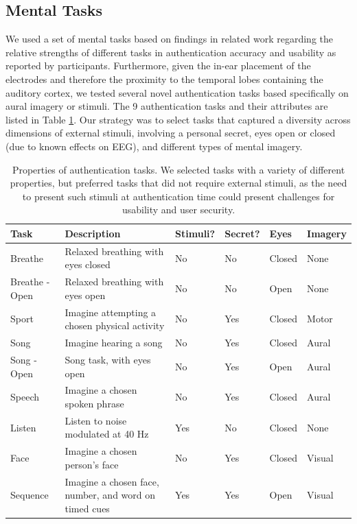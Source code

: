 \documentclass{sigchi}
\begin{document}
\subsection{Mental Tasks}

We used a set of mental tasks based on findings in related work regarding the relative strengths of different tasks in authentication accuracy and usability as reported by participants. Furthermore, given the in-ear placement of the electrodes and therefore the proximity to the temporal lobes containing the auditory cortex, we tested several novel authentication tasks based specifically on aural imagery or stimuli. The 9 authentication tasks and their attributes are listed in Table \ref{tab:tasks}. Our strategy was to select tasks that captured a diversity across dimensions of external stimuli, involving a personal secret, eyes open or closed (due to known effects on EEG), and different types of mental imagery.

\begin{table}[t]
\centering
\begin{tabularx}{\textwidth}{llllll}

\textbf{Task} & \textbf{Description} & \textbf{Stimuli}? & \textbf{Secret}? & \textbf{Eyes} & \textbf{Imagery}\\
\hline
Breathe & Relaxed breathing with eyes closed & No & No & Closed & None\\
Breathe - Open & Relaxed breathing with eyes open & No & No & Open & None\\
Sport & Imagine attempting a chosen physical activity & No & Yes & Closed & Motor\\
Song & Imagine hearing a song & No & Yes & Closed & Aural\\
Song - Open & Song task, with eyes open & No & Yes & Open & Aural\\
Speech & Imagine a chosen spoken phrase & No & Yes & Closed & Aural\\
Listen & Listen to noise modulated at 40 Hz & Yes & No & Closed & None\\
Face & Imagine a chosen person's face & No & Yes & Closed & Visual\\
Sequence & Imagine a chosen face, number, and word on timed cues & Yes & Yes & Open & Visual\\
\hline
\end{tabularx}
\caption{Properties of authentication tasks. We selected tasks with a variety of different properties, but preferred tasks that did not require external stimuli, as the need to present such stimuli at authentication time could present challenges for usability and user security.}
\label{tab:tasks}%
\end{table}
\end{document}
